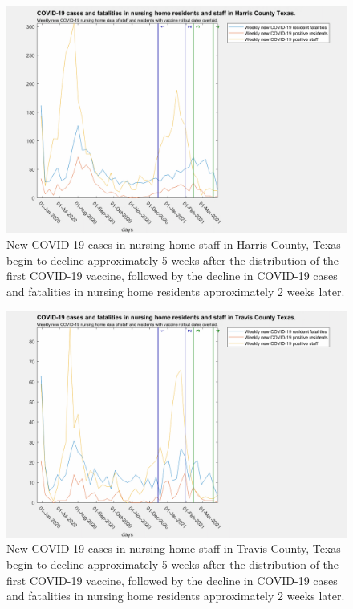 \documentclass[twoside]{article}
\begin{document}
\begin{multicols}{2}
\begin{figure}[H]
	\includegraphics[width=\linewidth]{images/harris_nursing_home_with_vaccine.png}
	\caption{New COVID-19 cases in nursing home staff in Harris County, Texas begin to decline approximately 5 weeks after the distribution of the first COVID-19 vaccine, followed by the decline in COVID-19 cases and fatalities in nursing home residents approximately 2 weeks later. }
	\label{fig:images/harris_nursing_home_with_vaccineLabel}
\end{figure}

\begin{figure}[H]
	\includegraphics[width=\linewidth]{images/travis_nursing_home_with_vaccine.png}
	\caption{New COVID-19 cases in nursing home staff in Travis County, Texas begin to decline approximately 5 weeks after the distribution of the first COVID-19 vaccine, followed by the decline in COVID-19 cases and fatalities in nursing home residents approximately 2 weeks later. }
	\label{fig:images/travis_nursing_home_with_vaccineLabel}
\end{figure}


\end{multicols}
\end{document}
